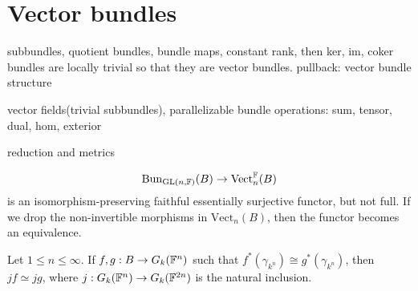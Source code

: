 \documentclass{../../large}
\begin{document}
\section{Vector bundles}
subbundles, quotient bundles, bundle maps,
constant rank, then ker, im, coker bundles are locally trivial so that they are vector bundles.
pullback: vector bundle structure

vector fields(trivial subbundles), parallelizable
bundle operations: sum, tensor, dual, hom, exterior

reduction and metrics


\[\mathrm{Bun}_{\mathrm{GL}(n,\mathbb{F})}(B)\to\mathrm{Vect}_n^{\mathbb{F}}(B)\]
is an isomorphism-preserving faithful essentially surjective functor, but not full.
If we drop the non-invertible morphisms in $\mathrm{Vect}_n(B)$, then the functor becomes an equivalence.


Let $1\le n\le\infty$.
If $f,g:B\to G_k(\mathbb{F}^n)$ such that $f^*(\gamma_{k^n})\cong g^*(\gamma_{k^n})$, then $jf\simeq jg$, where $j:G_k(\mathbb{F}^n)\to G_k(\mathbb{F}^{2n})$ is the natural inclusion.
\end{document}
